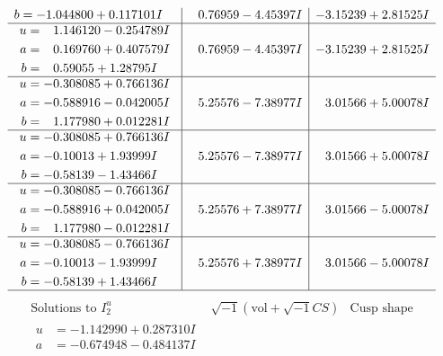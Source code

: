 \documentclass[1p]{elsarticle_modified}
\theoremstyle{definition}
\newcommand{\I}{\sqrt{-1}}
\begin{document}
$$\begin{array}{c|c|c}
\begin{aligned}
b &= -1.044800 + 0.117101 I\end{aligned}
 & \phantom{-}0.76959 - 4.45397 I & -3.15239 + 2.81525 I \\ \hline\begin{aligned}
u &= \phantom{-}1.146120 - 0.254789 I \\
a &= \phantom{-}0.169760 + 0.407579 I \\
b &= \phantom{-}0.59055 + 1.28795 I\end{aligned}
 & \phantom{-}0.76959 - 4.45397 I & -3.15239 + 2.81525 I \\ \hline\begin{aligned}
u &= -0.308085 + 0.766136 I \\
a &= -0.588916 - 0.042005 I \\
b &= \phantom{-}1.177980 + 0.012281 I\end{aligned}
 & \phantom{-}5.25576 - 7.38977 I & \phantom{-}3.01566 + 5.00078 I \\ \hline\begin{aligned}
u &= -0.308085 + 0.766136 I \\
a &= -0.10013 + 1.93999 I \\
b &= -0.58139 - 1.43466 I\end{aligned}
 & \phantom{-}5.25576 - 7.38977 I & \phantom{-}3.01566 + 5.00078 I \\ \hline\begin{aligned}
u &= -0.308085 - 0.766136 I \\
a &= -0.588916 + 0.042005 I \\
b &= \phantom{-}1.177980 - 0.012281 I\end{aligned}
 & \phantom{-}5.25576 + 7.38977 I & \phantom{-}3.01566 - 5.00078 I \\ \hline\begin{aligned}
u &= -0.308085 - 0.766136 I \\
a &= -0.10013 - 1.93999 I \\
b &= -0.58139 + 1.43466 I\end{aligned}
 & \phantom{-}5.25576 + 7.38977 I & \phantom{-}3.01566 - 5.00078 I\\
 \hline 
 \end{array}$$\newpage$$\begin{array}{c|c|c}  
\text{Solutions to }I^u_{2}& \I (\text{vol} + \sqrt{-1}CS) & \text{Cusp shape}\\
 \hline 
\begin{aligned}
u &= -1.142990 + 0.287310 I \\
a &= -0.674948 - 0.484137 I \\

\end{aligned}
\end{array}$$
\end{document}
